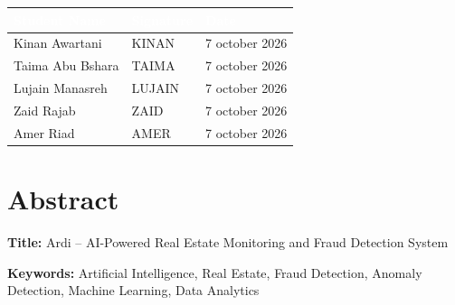 \documentclass[12pt,a4paper,oneside]{report}
\renewcommand{\arraystretch}{1.35}
\newcommand{\ProjectName}{Ardi}
\newcommand{\ProjectFullTitle}{
AI-Powered Real Estate Monitoring and Fraud Detection System
}
\begin{document}
\vspace{1cm}

\begin{center}

\renewcommand{\arraystretch}{1.7}

\begin{tabular}{
|L{6cm}|
C{3cm}|
C{3cm}|
}

\hline


\textcolor{white}{\textbf{Student Name}}
&
\textcolor{white}{\textbf{Signature}}
&
\textcolor{white}{\textbf{Date}}
\\

\hline

Kinan Awartani
&
KINAN
&
7 october 2026
\\

\hline

Taima Abu Bshara
&
TAIMA
&
7 october 2026
\\

\hline

Lujain Manasreh
&
LUJAIN
&
7 october 2026
\\

\hline

Zaid Rajab
&
ZAID
&
7 october 2026
\\

\hline

Amer Riad
&
AMER
&
7 october 2026
\\

\hline

\end{tabular}

\end{center}

\clearpage


\chapter*{Abstract}


\textbf{Title:}
\ProjectName{} -- \ProjectFullTitle

\vspace{0.3cm}

\textbf{Keywords:}
Artificial Intelligence,
Real Estate,
Fraud Detection,
Anomaly Detection,
Machine Learning,
Data Analytics
\end{document}
